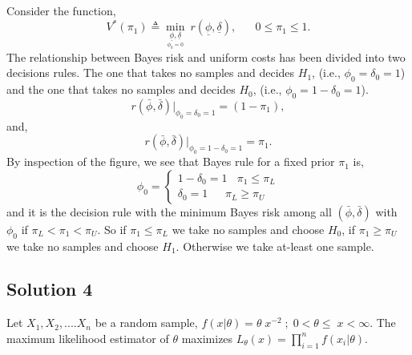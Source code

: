 \documentclass[a4paper,english,12pt]{article}
\begin{document}
Consider the function,
\begin{equation*}
V^*(\pi_1) \triangleq \underset{\underset{\phi_0=0}{\underline{\phi},\underline{\delta}}}{\min}~r(\underline{\phi},\underline{\delta}),\hspace{20pt}0\leq \pi_1 \leq 1.
\end{equation*}
The relationship between Bayes risk and uniform costs has been divided into two decisions rules.
The one that takes no samples and decides $H_{1}$, (i.e., $\phi_{0}=\delta_{0}=1$) and the one that takes no samples and decides $H_{0}$, (i.e., $\phi_{0}=1-\delta_{0}=1$).
\begin{equation*}
r(\bar{\phi},\bar{\delta})|_{\phi_{0}=\delta_{0}=1}=(1-\pi_{1}),
\end{equation*}
and,
\begin{equation*}
r(\bar{\phi},\bar{\delta})|_{\phi_{0}=1-\delta_{0}=1}=\pi_{1}.
\end{equation*}
By inspection of the figure, we see that Bayes rule for a fixed prior $\pi_{1}$ is,
\begin{equation*}
\phi_{0}=
\begin{cases}
1-\delta_{0} = 1~~~~\pi_{1}\leq\pi_{L} \\
\delta_{0} = 1~~~~~~~\pi_{L}\geq\pi_{U}
\end{cases}
\end{equation*}
and it is the decision rule with the minimum Bayes risk among all $(\bar \phi,\bar \delta)$ with $\phi_{0}$ if $\pi_{L}<\pi_{1}<\pi_{U} $. So if $\pi_{1}\leq\pi_{L}$ we take no samples and choose $H_{0}$, if $\pi_{1}\geq \pi_{U}$ we take no samples and choose $H_{1}$. Otherwise we take at-least one sample.
\hypertarget{solution4}{\subsection*{Solution 4}}
Let $X_1,X_2,....X_n$ be a random sample, $f(x|\theta)=\theta\;x^{-2} \; ;\;0<\theta\leq\;x<\infty$. The maximum likelihood estimator of $\theta$ maximizes $L_\theta(x) = \prod_{i=1}^{n} f(x_i|\theta)$.
\end{document}

